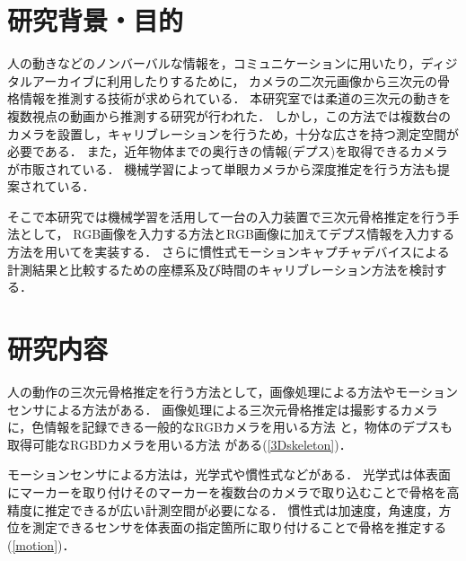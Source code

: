 \documentclass[titlepage]{jarticle}
\begin{document}
\maketitle

\section{研究背景・目的}
人の動きなどのノンバーバルな情報を，コミュニケーションに用いたり，ディジタルアーカイブに利用したりするために，
カメラの二次元画像から三次元の骨格情報を推測する技術が求められている．
本研究室では柔道の三次元の動きを複数視点の動画から推測する研究\cite{turugi}が行われた．
しかし，この方法では複数台のカメラを設置し，キャリブレーションを行うため，十分な広さを持つ測定空間が必要である．
また，近年物体までの奥行きの情報(デプス)を取得できるカメラが市販されている．
機械学習によって単眼カメラから深度推定を行う方法も提案されている\cite{depth}．

そこで本研究では機械学習を活用して一台の入力装置で三次元骨格推定を行う手法として，
RGB画像を入力する方法とRGB画像に加えてデプス情報を入力する方法を用いてを実装する．
さらに慣性式モーションキャプチャデバイスによる計測結果と比較するための座標系及び時間のキャリブレーション方法を検討する．
\section{研究内容}
%
人の動作の三次元骨格推定を行う方法として，画像処理による方法やモーションセンサによる方法がある．%
画像処理による三次元骨格推定は撮影するカメラに，色情報を記録できる一般的なRGBカメラを用いる方法
と，物体のデプスも取得可能なRGBDカメラを用いる方法
がある(\ref{3Dskeleton})．

モーションセンサによる方法は，光学式や慣性式などがある．
光学式は体表面にマーカーを取り付けそのマーカーを複数台のカメラで取り込むことで骨格を高精度に推定できるが広い計測空間が必要になる．
慣性式は加速度，角速度，方位を測定できるセンサを体表面の指定箇所に取り付けることで骨格を推定する(\ref{motion})．

\end{document}
